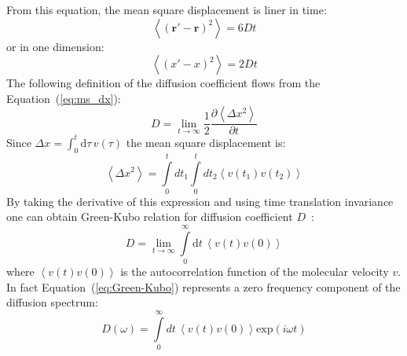 From this equation, the mean square displacement is liner in time:
\begin{equation}\label{eq:ms_dr}
\left<(\mathbf{r'}-\mathbf{r})^2\right>=6Dt
\end{equation}
or in one dimension:
\begin{equation}\label{eq:ms_dx}
\left<(x'-x)^2\right>=2Dt
\end{equation}
The following definition of the diffusion coefficient flows from the Equation~(\ref{eq:ms_dx}):
\begin{equation}\label{eq:D_v}
D=\lim_{t\rightarrow\infty}\frac{1}{2}\frac{\partial\left<\Delta x^2\right>}{\partial t}
\end{equation}
Since $\Delta x = \int_0^t \mathrm{d}\tau \, v({\tau})$ the mean square displacement is:
\begin{equation}\label{eq:D_v}
\left<\Delta x^2\right>=\int\limits_0^tdt_1\int\limits_0^tdt_2\left<v(t_1)v(t_2)\right>
\end{equation}
By taking the derivative of this expression and using time translation invariance one can obtain Green-Kubo relation for diffusion coefficient $D$~\cite{Peliti}:
\begin{equation}\label{eq:Green-Kubo}
D=\lim_{t \rightarrow \infty}\int\limits_0^\infty \mathrm{d} t \, \left<v(t) v(0)\right>
\end{equation}
where $\left<v(t) v(0)\right>$ is the autocorrelation function of the molecular velocity $v$. In fact Equation~(\ref{eq:Green-Kubo}) represents a zero frequency component of the diffusion spectrum:
\begin{equation}\label{eq:diffusion spectrum}
D(\omega)=\int\limits_0^\infty dt \, \left< v(t) v(0)\right> \mathrm{exp}(i\omega t) 
\end{equation}
